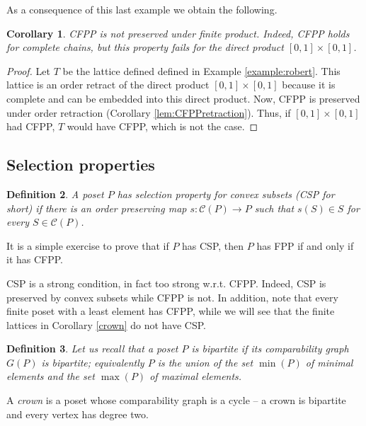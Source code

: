 \documentclass[12pt]{amsart}
\newtheorem{definition}{{\bf Definition}}[section]
\newtheorem{corollary}[definition]{{\bf Corollary}}
\begin{document}
\medskip

As a consequence of this last example we obtain the following. 

\begin{corollary} \label{cor:failure CFPP}
CFPP is not preserved under finite product. Indeed, CFPP holds for
complete chains, but this property fails for the direct product $[0,
1]\times [0,1]$.
\end{corollary}
 
\begin{proof}
Let $T$ be the lattice defined defined in Example
\ref{example:robert}. This lattice is an order retract of the direct
product $[0, 1]\times [0, 1]$ because it is complete and  can be embedded into this
direct product. Now, CFPP is preserved under order
retraction (Corollary \ref{lem:CFPPretraction}). Thus, if $[0,
1]\times [0, 1]$ had CFPP, $T$ would have CFPP, which is not the
case. 
\end{proof}

 
\subsection{Selection properties}

\begin{definition}
A poset $P$ has {\em selection property for convex subsets} (CSP
for short) if there is an order preserving map $s :\mathcal
C(P)\rightarrow P$ such that $s(S)\in S$ for every $S\in \mathcal C
(P)$.
\end{definition}

It is a simple exercise to prove that if $P$ has CSP, then $P$ has FPP
if and only if it has CFPP.

CSP is a strong condition, in fact too strong w.r.t. CFPP. Indeed,
CSP is preserved by convex subsets while CFPP is not.   In addition,
note that every finite poset with a least element has CFPP, while 
we will see that the finite lattices in Corollary \ref{crown} do not have CSP. 

\begin{definition}
Let us recall that a poset $P$ is \emph{bipartite} if its
comparability graph $G(P)$ is bipartite; equivalently $P$ is the union
of the set $\min (P)$ of minimal elements and the set $\max (P)$ of
maximal elements. 
\end{definition}

A \emph{crown} is a poset whose comparability graph is a cycle -- a
crown is bipartite and every vertex has degree two.
\end{document}
